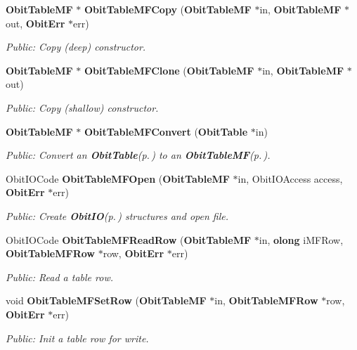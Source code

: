 \begin{CompactItemize}
{\bf Obit\-Table\-MF} $\ast$ {\bf Obit\-Table\-MFCopy} ({\bf Obit\-Table\-MF} $\ast$in, {\bf Obit\-Table\-MF} $\ast$out, {\bf Obit\-Err} $\ast$err)
\begin{CompactList}\small\item\em Public: Copy (deep) constructor. \item\end{CompactList}\item 
{\bf Obit\-Table\-MF} $\ast$ {\bf Obit\-Table\-MFClone} ({\bf Obit\-Table\-MF} $\ast$in, {\bf Obit\-Table\-MF} $\ast$out)
\begin{CompactList}\small\item\em Public: Copy (shallow) constructor. \item\end{CompactList}\item 
{\bf Obit\-Table\-MF} $\ast$ {\bf Obit\-Table\-MFConvert} ({\bf Obit\-Table} $\ast$in)
\begin{CompactList}\small\item\em Public: Convert an {\bf Obit\-Table}{\rm (p.\,\pageref{structObitTable})} to an {\bf Obit\-Table\-MF}{\rm (p.\,\pageref{structObitTableMF})}. \item\end{CompactList}\item 
Obit\-IOCode {\bf Obit\-Table\-MFOpen} ({\bf Obit\-Table\-MF} $\ast$in, Obit\-IOAccess access, {\bf Obit\-Err} $\ast$err)
\begin{CompactList}\small\item\em Public: Create {\bf Obit\-IO}{\rm (p.\,\pageref{structObitIO})} structures and open file. \item\end{CompactList}\item 
Obit\-IOCode {\bf Obit\-Table\-MFRead\-Row} ({\bf Obit\-Table\-MF} $\ast$in, {\bf olong} i\-MFRow, {\bf Obit\-Table\-MFRow} $\ast$row, {\bf Obit\-Err} $\ast$err)
\begin{CompactList}\small\item\em Public: Read a table row. \item\end{CompactList}\item 
void {\bf Obit\-Table\-MFSet\-Row} ({\bf Obit\-Table\-MF} $\ast$in, {\bf Obit\-Table\-MFRow} $\ast$row, {\bf Obit\-Err} $\ast$err)
\begin{CompactList}\small\item\em Public: Init a table row for write. \item\end{CompactList}\item 

\end{CompactItemize}
